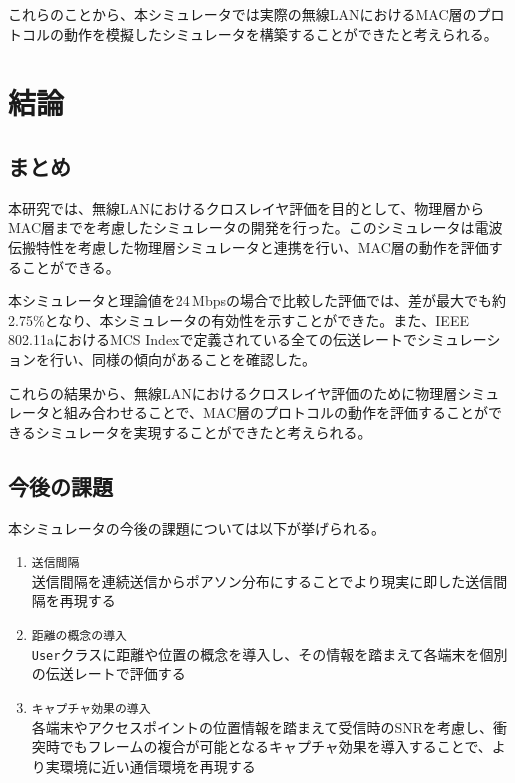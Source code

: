 \documentclass[a4paper,10pt]{ltjsarticle}
\begin{document}
これらのことから、本シミュレータでは実際の無線LANにおけるMAC層のプロトコルの動作を模擬したシミュレータを構築することができたと考えられる。

\clearpage
\section{結論}
\subsection{まとめ}
本研究では、無線LANにおけるクロスレイヤ評価を目的として、物理層からMAC層までを考慮したシミュレータの開発を行った。このシミュレータは電波伝搬特性を考慮した物理層シミュレータと連携を行い、MAC層の動作を評価することができる。

本シミュレータと理論値を24\,Mbpsの場合で比較した評価では、差が最大でも約2.75\%となり、本シミュレータの有効性を示すことができた。また、IEEE 802.11aにおけるMCS Indexで定義されている全ての伝送レートでシミュレーションを行い、同様の傾向があることを確認した。

これらの結果から、無線LANにおけるクロスレイヤ評価のために物理層シミュレータと組み合わせることで、MAC層のプロトコルの動作を評価することができるシミュレータを実現することができたと考えられる。



\subsection{今後の課題}
本シミュレータの今後の課題については以下が挙げられる。

\begin{enumerate}
  \item \texttt{送信間隔}\\送信間隔を連続送信からポアソン分布にすることでより現実に即した送信間隔を再現する
  \item \texttt{距離の概念の導入}\\\texttt{User}クラスに距離や位置の概念を導入し、その情報を踏まえて各端末を個別の伝送レートで評価する
  \item \texttt{キャプチャ効果の導入}\\各端末やアクセスポイントの位置情報を踏まえて受信時のSNRを考慮し、衝突時でもフレームの複合が可能となるキャプチャ効果を導入することで、より実環境に近い通信環境を再現する
\end{enumerate}
\end{document}
